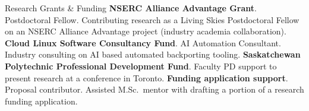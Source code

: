 \begin{rubric}{Research Grants \& Funding}
\entry*[Ongoing]%
	\textbf{NSERC Alliance Advantage Grant}. Postdoctoral Fellow.
	Contributing research as a Living Skies Postdoctoral Fellow on an NSERC Alliance Advantage project (industry academia collaboration).
\vspace{-1mm}
\entry*[2025/26]%
	\textbf{Cloud Linux Software Consultancy Fund}. AI Automation Consultant.
	Industry consulting on AI based automated backporting tooling.
\vspace{-1mm}
\entry*[2025]%
	\textbf{Saskatchewan Polytechnic Professional Development Fund}.
	Faculty PD support to present research at a conference in Toronto.
\vspace{-1mm}
\entry*[Support]%
	\textbf{Funding application support}. Proposal contributor.
	Assisted M.Sc.\ mentor with drafting a portion of a research funding application.
\end{rubric}
